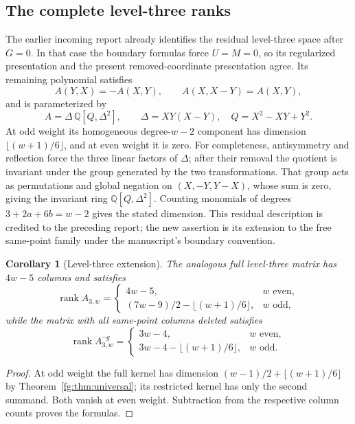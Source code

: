 \documentclass[11pt,a4paper]{article}
\newtheorem{corollary}[theorem]{Corollary}
\theoremstyle{definition}
\theoremstyle{remark}
\numberwithin{equation}{section}
\begin{document}
\subsection{The complete level-three ranks}

The earlier incoming report \cite{PriorResearch} already identifies the residual
level-three space after $G=0$. In that case the boundary formulas
force $U=M=0$, so its regularized presentation and the present
removed-coordinate presentation agree. Its remaining polynomial
satisfies
\[
 A(Y,X)=-A(X,Y),\qquad A(X,X-Y)=A(X,Y),
\]
and is parameterized by
\[
 A=\Delta\,\mathbb Q[Q,\Delta^2],\qquad
 \Delta=XY(X-Y),\quad Q=X^2-XY+Y^2.
\]
At odd weight its homogeneous degree-$w-2$ component has dimension
$\lfloor(w+1)/6\rfloor$, and at even weight it is zero.
For completeness, antisymmetry and reflection force the three
linear factors of $\Delta$; after their removal the quotient is
invariant under the group generated by the two transformations.
That group acts as permutations and global negation on
$(X,-Y,Y-X)$, whose sum is zero, giving the invariant ring
$\mathbb Q[Q,\Delta^2]$. Counting monomials of degrees
$3+2a+6b=w-2$ gives the stated dimension.
This residual description is credited to the preceding report; the
new assertion is its extension to the free same-point family under
the manuscript's boundary convention.

\begin{corollary}[Level-three extension]\label{fg:cor:level3}
The analogous full level-three matrix has $4w-5$ columns and satisfies
\[
 \operatorname{rank}A_{3,w}
 =\begin{cases}
    4w-5,&w\text{ even},\\
    (7w-9)/2-\lfloor(w+1)/6\rfloor,&w\text{ odd},
  \end{cases}
\]
while the matrix with all same-point columns deleted satisfies
\[
 \operatorname{rank}A_{3,w}^{\neg g}
 =\begin{cases}
    3w-4,&w\text{ even},\\
    3w-4-\lfloor(w+1)/6\rfloor,&w\text{ odd}.
  \end{cases}
\]
\end{corollary}
\begin{proof}
At odd weight the full kernel has dimension
$(w-1)/2+\lfloor(w+1)/6\rfloor$ by
Theorem~\ref{fg:thm:universal}; its restricted kernel has only the
second summand. Both vanish at even weight. Subtraction from the
respective column counts proves the formulas.
\end{proof}
\end{document}
